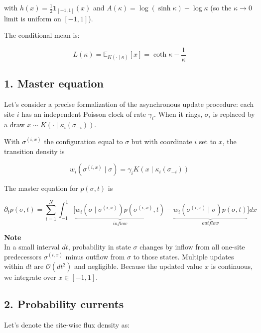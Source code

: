 \documentclass{article}
\begin{document}
with $h(x)=\tfrac12 \mathbf{1}_{[ -1,1]}(x)$ and $A(\kappa)=\log(\sinh\kappa) -\log\kappa$ (so the $\kappa\to0$ limit is uniform on $[ -1,1]$).

The conditional mean is:

\begin{equation}
L(\kappa) =\mathbb{E}_{K(\cdot\mid\kappa)}[x] = \coth\kappa - \frac{1}{\kappa}
\end{equation}

\subsection{1. Master equation}

Let's consider a precise formalization of the asynchronous update procedure: each site $i$ has an independent Poisson clock of rate $\gamma_i$. When it rings, $\sigma_i$ is replaced by a draw $x\sim K(\cdot\mid\kappa_i(\sigma_{ -i}))$.

With $\sigma^{(i,x)}$ the configuration equal to $\sigma$ but with coordinate $i$ set to $x$, the transition density is

\begin{equation}
w_i(\sigma^{(i,x)}\mid\sigma) =\gamma_i K(x\mid\kappa_i(\sigma_{-i}))
\end{equation}

The master equation for $p(\sigma,t)$ is

\begin{equation}
\partial_t p(\sigma,t) =\sum_{i=1}^N\int_{-1}^{1} \Big[ \underbrace{w_i(\sigma\mid\sigma^{(i,x)}) p(\sigma^{(i,x)},t)}_{inflow} - \underbrace{w_i(\sigma^{(i,x)}\mid\sigma) p(\sigma,t)}_{outflow}\Big] dx
\end{equation}

\begin{framed}
\textbf{Note}\\
In a small interval $dt$, probability in state $\sigma$ changes by inflow from all one-site predecessors $\sigma^{(i,x)}$ minus outflow from $\sigma$ to those states. Multiple updates within $dt$ are $\mathcal{O}(dt^2)$ and negligible. Because the updated value $x$ is continuous, we integrate over $x\in[ -1,1]$.
\end{framed}

\subsection{2. Probability currents}

Let's denote the site-wise flux density as:
\end{document}
